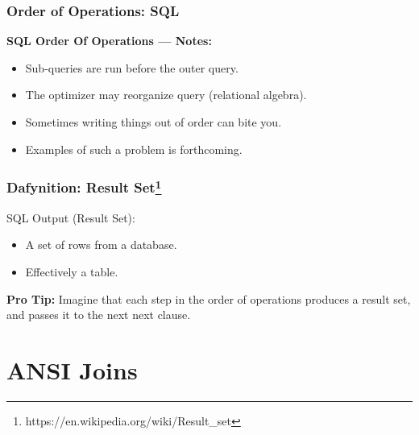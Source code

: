 \documentclass{beamer}
\begin{document}
\begin{frame} %
  \frametitle{Order of Operations: SQL}

  \textbf{SQL Order Of Operations --- Notes:}

  \bigskip
  \begin{itemize}
  \item Sub-queries are run before the outer query.
  \item The optimizer may reorganize query (relational algebra).
  \item Sometimes writing things out of order can bite you.
  \item Examples of such a problem is forthcoming.
  \end{itemize}
  
\end{frame}

\begin{frame} %
  \frametitle{Dafynition: Result Set\footnote{https://en.wikipedia.org/wiki/Result\_set}}

  SQL Output (Result Set):

  \begin{itemize}
  \item A set of rows from a database.
  \item Effectively a table.
  \end{itemize}

  \pause
  \begin{center}
  \bigskip \textbf{Pro Tip: } Imagine that each step in the order of
  operations produces a result set, and passes it to the next next
  clause.

  \end{center}


\end{frame}  

\section{ANSI  Joins} %
\end{document}
